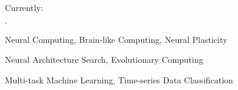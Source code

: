 \documentclass{joel_cv}
\begin{document}
\begin{cvHeader}
\end{cvHeader}


%
%

Currently:
\begin{sectionItemize}{$\cdot$}
	\item Neural Computing, Brain-like Computing, Neural Plasticity
    \item Neural Architecture Search, Evolutionary Computing
    \item Multi-task Machine Learning, Time-series Data Classification
\end{sectionItemize}

%
%
\end{document}
